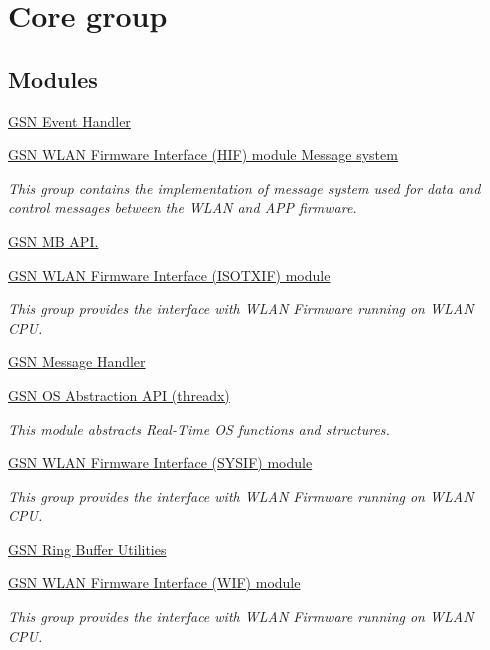 \hypertarget{a00681}{
\section{Core group}
\label{a00681}
}
\subsection*{Modules}
\begin{DoxyCompactItemize}
\item 
\hyperlink{a00622}{GSN Event Handler}
\item 
\hyperlink{a00623}{GSN WLAN Firmware Interface (HIF) module Message system}


\begin{DoxyCompactList}\small\item\em This group contains the implementation of message system used for data and control messages between the WLAN and APP firmware. \end{DoxyCompactList}

\item 
\hyperlink{a00624}{GSN MB API.}
\item 
\hyperlink{a00625}{GSN WLAN Firmware Interface (ISOTXIF) module}


\begin{DoxyCompactList}\small\item\em This group provides the interface with WLAN Firmware running on WLAN CPU. \end{DoxyCompactList}

\item 
\hyperlink{a00627}{GSN Message Handler}
\item 
\hyperlink{a00628}{GSN OS Abstraction API (threadx)}


\begin{DoxyCompactList}\small\item\em This module abstracts Real-\/Time OS functions and structures. \end{DoxyCompactList}

\item 
\hyperlink{a00630}{GSN WLAN Firmware Interface (SYSIF) module}


\begin{DoxyCompactList}\small\item\em This group provides the interface with WLAN Firmware running on WLAN CPU. \end{DoxyCompactList}

\item 
\hyperlink{a00632}{GSN Ring Buffer Utilities}
\item 
\hyperlink{a00635}{GSN WLAN Firmware Interface (WIF) module}


\begin{DoxyCompactList}\small\item\em This group provides the interface with WLAN Firmware running on WLAN CPU. \end{DoxyCompactList}

\end{DoxyCompactItemize}


